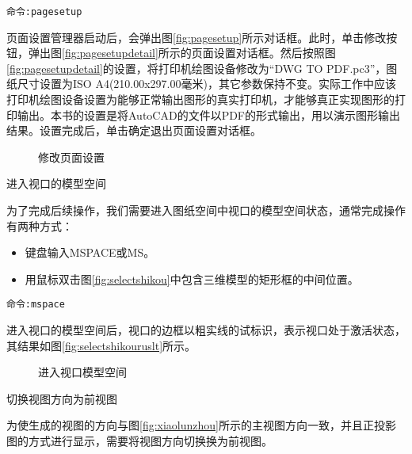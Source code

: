 \begin{procedure}
\begin{lstlisting}
命令:pagesetup
\end{lstlisting}

页面设置管理器启动后，会弹出图\ref{fig:pagesetup}所示对话框。此时，单击修改按钮，弹出图\ref{fig:pagesetupdetail}所示的页面设置对话框。然后按照图\ref{fig:pagesetupdetail}的设置，将打印机绘图设备修改为“DWG TO PDF.pc3”，图纸尺寸设置为ISO A4(210.00x297.00毫米)，其它参数保持不变。实际工作中应该打印机绘图设备设置为能够正常输出图形的真实打印机，才能够真正实现图形的打印输出。本书的设置是将AutoCAD的文件以PDF的形式输出，用以演示图形输出结果。设置完成后，单击确定退出页面设置对话框。

\begin{figure}[htbp]
\centering
{}
\hspace{20pt}
\caption{修改页面设置}
\end{figure}

\item 进入视口的模型空间

为了完成后续操作，我们需要进入图纸空间中视口的模型空间状态，通常完成操作有两种方式：
\begin{itemize}
\item 键盘输入MSPACE或MS。
\item 用鼠标双击图\ref{fig:selectshikou}中包含三维模型的矩形框的中间位置。
\end{itemize}

\begin{lstlisting}
命令:mspace
\end{lstlisting}

进入视口的模型空间后，视口的边框以粗实线的试标识，表示视口处于激活状态，其结果如图\ref{fig:selectshikouruslt}所示。
\begin{figure}[htbp]
\centering
{}
\hspace{20pt}
\caption{进入视口模型空间}
\end{figure}
\item 切换视图方向为前视图

为使生成的视图的方向与图\ref{fig:xiaolunzhou}所示的主视图方向一致，并且正投影图的方式进行显示，需要将视图方向切换换为前视图。

\begin{figure}[htbp]
\centering
\begin{floatrow}[2]
\end{floatrow}
\end{figure}
\begin{lstlisting}


\end{lstlisting}
\end{procedure}
